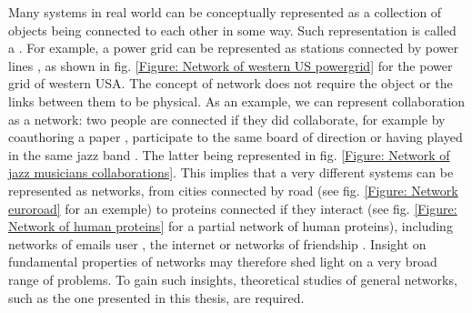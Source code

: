 \documentclass[
11pt, %
english, %
singlespacing, %
nolistspacing, %
liststotoc, %
headsepline, %
]{MastersDoctoralThesis} %
\begin{document}
Many systems in real world can be conceptually represented as a collection of objects being connected to each other in some way. Such representation is called a . For example, a power grid can be represented as stations connected by power lines \cite{watts1998collective}, as shown in fig. \ref{Figure: Network of western US powergrid} for the power grid of western USA. The concept of network does not require the object or the links between them to be physical. As an example, we can represent collaboration as a network: two people are connected if they did collaborate, for example by coauthoring a paper \cite{grossman1995portion}, participate to the same board of direction \cite{davis1997corporate} or having played in the same jazz band \cite{gleiser2003community}. The latter being represented in fig. \ref{Figure: Network of jazz musicians collaborations}. This implies that a very different systems can be represented as networks, from cities connected by road \cite{leskovec2008community, subelj2011robust} (see fig. \ref{Figure: Network euroroad} for an exemple) to proteins connected if they interact \cite{ewing2007large, rual2005towards, stelzl2005human} (see fig. \ref{Figure: Network of human proteins} for a partial network of human proteins), including networks of emails user \cite{guimera2003self, newman2002email}, the internet \cite{albert1999internet} or networks of friendship \cite{foster1963study}. Insight on fundamental properties of networks may therefore shed light on a very broad range of problems. To gain such insights, theoretical studies of general networks, such as the one presented in this thesis, are required.
\end{document}
